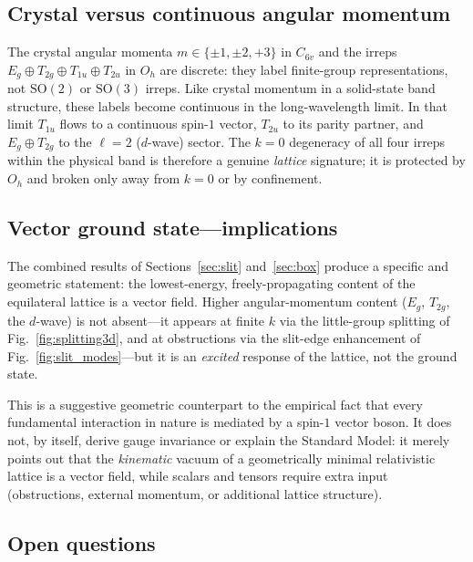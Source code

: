 \documentclass[twocolumn,showpacs,preprintnumbers,amsmath,amssymb]{revtex4-2}
\newcommand{\Oh}{O_{h}}
\newcommand{\Csix}{C_{6v}}
\begin{document}
\subsection{Crystal versus continuous angular momentum}

The crystal angular momenta $m\in\{\pm 1,\pm 2,+3\}$ in $\Csix$ and
the irreps $E_{g}\oplus T_{2g}\oplus T_{1u}\oplus T_{2u}$ in $\Oh$ are
discrete: they label finite-group representations, not
$\mathrm{SO}(2)$ or $\mathrm{SO}(3)$ irreps.
Like crystal momentum in a solid-state band structure, these labels
become continuous in the long-wavelength limit.
In that limit $T_{1u}$ flows to a continuous spin-$1$ vector,
$T_{2u}$ to its parity partner, and $E_{g}\oplus T_{2g}$ to the
$\ell=2$ ($d$-wave) sector.
The $k=0$ degeneracy of all four irreps within the physical band is
therefore a genuine \emph{lattice} signature; it is protected by
$\Oh$ and broken only away from $k=0$ or by confinement.

\subsection{Vector ground state---implications}

The combined results of Sections~\ref{sec:slit} and~\ref{sec:box}
produce a specific and geometric statement: the lowest-energy,
freely-propagating content of the equilateral lattice is a vector
field.
Higher angular-momentum content ($E_{g}$, $T_{2g}$, the $d$-wave)
is not absent---it appears at finite $k$ via the little-group
splitting of Fig.~\ref{fig:splitting3d}, and at obstructions via the
slit-edge enhancement of Fig.~\ref{fig:slit_modes}---but it is an
\emph{excited} response of the lattice, not the ground state.

This is a suggestive geometric counterpart to the empirical fact that
every fundamental interaction in nature is mediated by a spin-$1$
vector boson.
It does not, by itself, derive gauge invariance or explain the
Standard Model: it merely points out that the \emph{kinematic}
vacuum of a geometrically minimal relativistic lattice is a vector
field, while scalars and tensors require extra input
(obstructions, external momentum, or additional lattice structure).

\subsection{Open questions}
\end{document}
